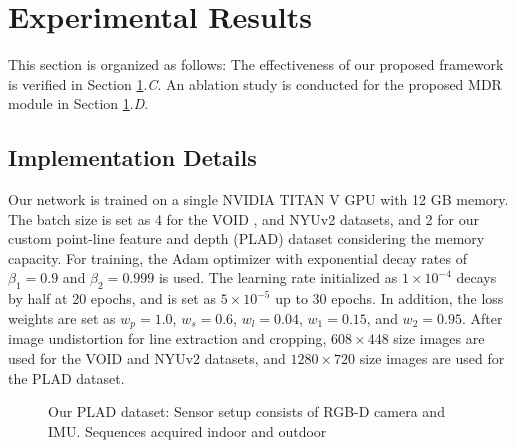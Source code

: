 \section{Experimental Results}\label{sec:exp_result}

\textcolor{color3}{
This section is organized as follows: The effectiveness of our proposed framework is verified in Section \ref{sec:exp_result}.\textit{C}. An ablation study is conducted for the proposed MDR module in Section \ref{sec:exp_result}.\textit{D}.
}




\subsection{Implementation Details}\label{sec:settings}


Our network is trained on a single NVIDIA TITAN V GPU with 12 GB memory. \textcolor{color1}{The batch} size is set \textcolor{color1}{as} 4 for \textcolor{color1}{the} VOID \cite{void}, \textcolor{color1}{and} NYUv2 \cite{nyuv2} \textcolor{color1}{datasets}, and 2 for our custom \textcolor{color1}{point-line feature and depth (PLAD)} dataset considering the memory capacity. 
For training, the Adam optimizer with exponential decay rates of $\beta_1 = 0.9$ and $\beta_2 = 0.999$ is used.
The learning rate initialized \textcolor{color1}{as} $1 \times 10^{-4}$ decays by half at 20 epochs\textcolor{color1}{,} and is set \textcolor{color1}{as} $5 \times 10^{-5}$ up to 30 epochs.
\textcolor{color1}{In addition}, \textcolor{color1}{the} loss weights are set \textcolor{color1}{as} $w_p=1.0$, $w_s=0.6$, $w_l=0.04$, $w_1=0.15$, and $w_2=0.95$. 
After image undistortion for line extraction and cropping, $608 \times 448$ \textcolor{color1}{size images} are used for \textcolor{color1}{the} VOID and NYUv2 \textcolor{color1}{datasets}, and $1280 \times 720$ size image\textcolor{color1}{s are} used for \textcolor{color1}{the} PLAD \textcolor{color1}{dataset}.

\begin{figure}[t!]
    \centering
    \caption{Our PLAD dataset: 
         Sensor setup consists of RGB-D camera and IMU. 
        \textcolor{color1}{S}equences \textcolor{color1}{acquired} 
         indoor and 
         outdoor
    }
    \label{fig:plad}
\end{figure}



